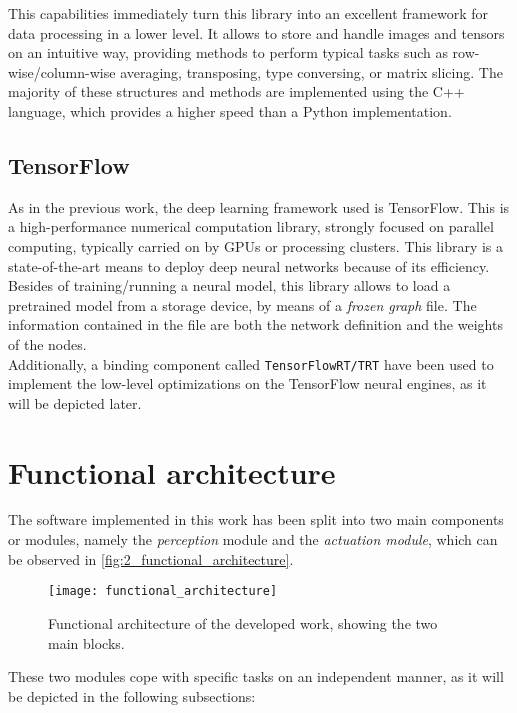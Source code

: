 This capabilities immediately turn this library into an excellent framework for data processing in a lower level. It allows to store and handle images and tensors on an intuitive way, providing methods to perform typical tasks such as row-wise/column-wise averaging, transposing, type conversing, or matrix slicing. The majority of these structures and methods are implemented using the C++ language, which provides a higher speed than a Python implementation.


\subsection{TensorFlow}


As in the previous work, the deep learning framework used is TensorFlow. This is a high-performance numerical computation library, strongly focused on parallel computing, typically carried on by GPUs or processing clusters. This library is a state-of-the-art means to deploy deep neural networks because of its efficiency. Besides of training/running a neural model, this library allows to load a pretrained model from a storage device, by means of a \textit{frozen graph} file. The information contained in the file are both the network definition and the weights of the nodes.\\

Additionally, a binding component called \texttt{TensorFlowRT/TRT} have been used to implement the low-level optimizations on the TensorFlow neural engines, as it will be depicted later.



\section{Functional architecture}
\label{sec:2_functional_architecture}
The software implemented in this work has been split into two main components or modules, namely the \textit{perception} module and the \textit{actuation module}, which can be observed in \autoref{fig:2_functional_architecture}.

\begin{figure}[h]
	\centering
	\texttt{[image: functional\_architecture]}
	\caption{Functional architecture of the developed work, showing the two main blocks.}
	\label{fig:2_functional_architecture}
\end{figure}

These two modules cope with specific tasks on an independent manner, as it will be depicted in the following subsections:

